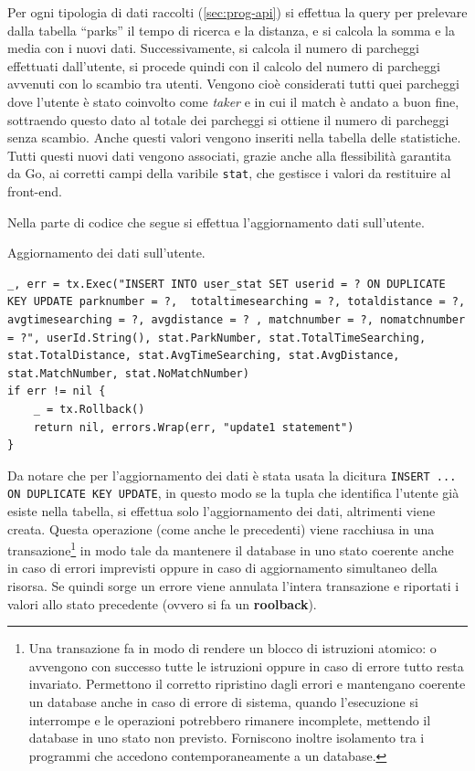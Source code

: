 \documentclass[italian, Lau, oneside, nodefaultfont, noexaminfo]{sapthesis}
\begin{document}
Per ogni tipologia di dati raccolti (\autoref{sec:prog-api}) si effettua la query per prelevare dalla tabella ``parks'' il tempo di ricerca e la distanza, e si calcola la somma e la media con i nuovi dati. Successivamente, si calcola il numero di parcheggi effettuati dall'utente, si procede quindi  con il calcolo del numero di  parcheggi avvenuti con lo scambio tra utenti. Vengono cioè considerati tutti quei parcheggi dove l'utente è stato coinvolto come \textit{taker} e in cui il match è andato a buon fine, sottraendo questo dato al totale dei parcheggi si ottiene il numero di parcheggi senza scambio. Anche  questi valori vengono inseriti nella tabella delle statistiche. Tutti questi nuovi dati  vengono associati, grazie anche alla flessibilità garantita da Go, ai corretti campi della varibile \texttt{stat}, che gestisce i valori da restituire al front-end.

Nella parte di codice che segue si effettua l'aggiornamento dati sull'utente.
\begin{listing}[H]
\caption{Aggiornamento dei dati sull'utente.}
\begin{verbatim}
_, err = tx.Exec("INSERT INTO user_stat SET userid = ? ON DUPLICATE KEY UPDATE parknumber = ?,  totaltimesearching = ?, totaldistance = ?, avgtimesearching = ?, avgdistance = ? , matchnumber = ?, nomatchnumber = ?", userId.String(), stat.ParkNumber, stat.TotalTimeSearching, stat.TotalDistance, stat.AvgTimeSearching, stat.AvgDistance, stat.MatchNumber, stat.NoMatchNumber)
if err != nil {
	_ = tx.Rollback()
	return nil, errors.Wrap(err, "update1 statement")
}
\end{verbatim}
\end{listing}

Da notare che per l'aggiornamento dei dati è stata usata la dicitura \texttt{INSERT ... ON DUPLICATE KEY UPDATE}, in questo modo se la tupla che identifica l'utente già esiste nella tabella, si effettua solo l'aggiornamento dei dati, altrimenti viene creata.
Questa operazione (come anche le precedenti) viene racchiusa in una transazione\footnote{Una transazione fa in modo di rendere un  blocco di istruzioni atomico: o avvengono con successo tutte le istruzioni oppure in caso di errore tutto resta invariato. Permettono il corretto ripristino dagli errori e mantengano coerente un database anche in caso di errore di sistema, quando l'esecuzione si interrompe e le operazioni potrebbero rimanere incomplete, mettendo il database in uno stato non previsto. Forniscono inoltre isolamento tra i programmi che accedono contemporaneamente a un database.} in modo tale da mantenere il database in uno stato coerente anche in caso di errori imprevisti oppure in caso di aggiornamento simultaneo della risorsa. Se quindi sorge un errore viene annulata l'intera transazione e riportati i valori allo stato precedente (ovvero si fa un \textbf{roolback}). \\
\end{document}
